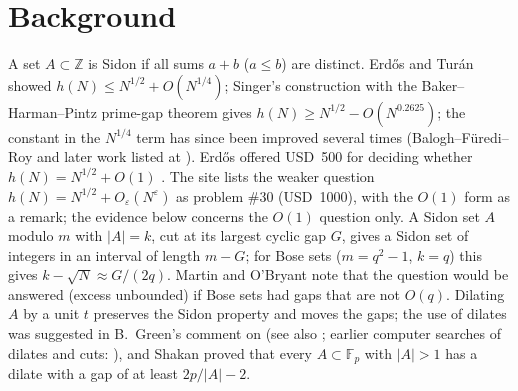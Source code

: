 \documentclass[11pt]{article}
\begin{document}
\begin{abstract}
(an average over dilates), which we isolate but do not prove; the Erd\H{o}s question remains open. \emph{New in Version 4:} exact values of the Galois autocorrelation $C(l)$ of the underlying Jacobi sums at $l=2,-1$ (minimal) and $l=3,-2$: $C(l)$ is an explicit function of an elementary count $P(l)$ (Proposition~\ref{prop:gal}), $P(2)=P(-1)=(q-2)^2$, $P(3)=(q-2)(2q-1)$ for $q\equiv2\pmod3$, and $P(-2)=(q-2)(2q-1)+b_q$ for every prime $q\ge5$, where $b_q=0$ for $q\equiv2\pmod3$ and $b_q=4x^2-2q$ for $q=x^2+3y^2$ (numerically the $q$-th coefficient of the CM form $\eta(2\tau)^3\eta(6\tau)^3$) (Theorem~\ref{thm:gal}; one step uses a known evaluation of a finite-field hypergeometric value, due to Ono and in the general form of Barman and Kalita).
\end{abstract}

\section{Background}
A set $A\subset\mathbb Z$ is Sidon if all sums $a+b$ ($a\le b$) are distinct. Erd\H{o}s and Tur\'an \cite{ET} showed
$h(N)\le N^{1/2}+O(N^{1/4})$; Singer's construction \cite{Si} with the Baker--Harman--Pintz prime-gap theorem \cite{BHP} gives
$h(N)\ge N^{1/2}-O(N^{0.2625})$; the constant in the $N^{1/4}$ term has since been improved several times (Balogh--F\"uredi--Roy
\cite{BFR} and later work listed at \cite{EP}). Erd\H{o}s offered USD~500 for deciding whether
$h(N)=N^{1/2}+O(1)$ \cite{Guy,MO}. The site \cite{EP} lists the weaker question $h(N)=N^{1/2}+O_\varepsilon(N^\varepsilon)$ as
problem \#30 (USD~1000), with the $O(1)$ form as a remark; the evidence below concerns the $O(1)$ question only.
A Sidon set $A$ modulo $m$ with $|A|=k$, cut at its largest cyclic gap $G$, gives a Sidon set of integers in an interval of length
$m-G$; for Bose sets \cite{Bo} ($m=q^2-1$, $k=q$) this gives $k-\sqrt{N}\approx G/(2q)$. Martin and O'Bryant \cite{MO} note that
the question would be answered (excess unbounded) if Bose sets had gaps that are not $O(q)$. Dilating $A$ by a unit $t$ preserves
the Sidon property and moves the gaps; the use of dilates was suggested in B.~Green's comment on \cite{Go} (see also \cite{Gr}; earlier computer searches of dilates and cuts: \cite{Z,RD}), and Shakan \cite{Sh}
proved that every $A\subset\mathbb F_p$ with $|A|>1$ has a dilate with a gap of at least $2p/|A|-2$.
\end{document}
